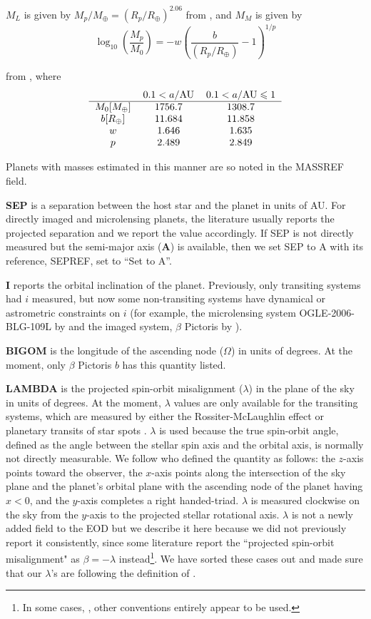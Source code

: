 \documentclass[11pt,preprint]{aastex}
\def\leq{\leqslant}
\def\rearth{R_\oplus}
\def\mearth{M_\oplus}
\begin{document}
\begin{CJK*}{UTF8}{gbsn}
$M_L$ is given by $M_{p}/\mearth=\left(R_{p}/\rearth\right)^{2.06}$ from \cite{Lissauer2011}, and $M_M$ is given by 
\[
\log_{10}\left(\frac{M_{p}}{M_0}\right)=-w\left(\frac{b}{\left(R_{p}/\rearth\right)}-1\right)^{1/p}
\]

\noindent from \cite{Mordasini2012}, where
\[
\begin{tabular}{ c c c }
  & $0.1<a/{\rm AU}$ & $0.1<a/{\rm AU} \leq 1$  \\ \hline $M_0[\mearth]$ & 1756.7 & 1308.7 \\
$b[\rearth]$ & 11.684 & 11.858 \\ $w$ & 1.646 & 1.635 \\ $p$ & 2.489 & 2.849 \\ 
\end{tabular}
\]

Planets with masses estimated in this manner are so noted in the
MASSREF field.

{\bf SEP} is a separation between the host star
and the planet in units of AU. For directly imaged and microlensing planets, the
literature usually reports the projected separation and we report the
value accordingly.  If SEP is not directly measured but the semi-major
axis ({\bf A}) is available, then we set SEP to A with its reference,
SEPREF, set to ``Set to A''. 

{\bf I} reports the orbital inclination of the planet. Previously,
only transiting systems had $i$ measured, but now some non-transiting
systems have dynamical or astrometric constraints on $i$ (for example,
the microlensing system OGLE-2006-BLG-109L by \citealt{Bennett2010}
and the imaged system, $\beta$ Pictoris by \citealt{Lagrange2009}).

{\bf BIGOM} is the longitude of the ascending node ($\Omega$) in units
of degrees. At the moment, only $\beta$ Pictoris $b$ has this quantity listed.

{\bf LAMBDA} is the projected spin-orbit misalignment ($\lambda$) in
the plane of the sky in units of degrees. At the moment, $\lambda$
values are only available for the transiting systems, which are
measured by either the Rossiter-McLaughlin effect
\citep[e.g.,][]{Winn2005} or planetary transits of star spots
\citep[e.g.,][]{Sanchis-Ojeda2012}. $\lambda$ is used because
the true spin-orbit angle, defined as the angle between the
stellar spin axis and the orbital axis, is normally not directly
measurable. We follow \cite{Fabrycky2009} who defined the quantity as follows: the
$z$-axis points toward the observer, the $x$-axis points along the
intersection of the sky plane and the planet's orbital plane with the
ascending node of the planet having $x<0$, and the $y$-axis completes
a right handed-triad. $\lambda$ is measured clockwise on the sky from
the $y$-axis to the projected stellar rotational axis. $\lambda$ is
not a newly added field to the EOD but we describe it here because we did not
previously report it consistently, since some literature report the ``projected
spin-orbit misalignment" as $\beta = -\lambda$ instead\footnote{In some cases, \citep[e.g.][]{Moutou2011}, other conventions entirely appear to be used.}. We have sorted
these cases out and made sure that our $\lambda$'s are following the
definition of \cite{Fabrycky2009}.


\end{CJK*}
\end{document}
